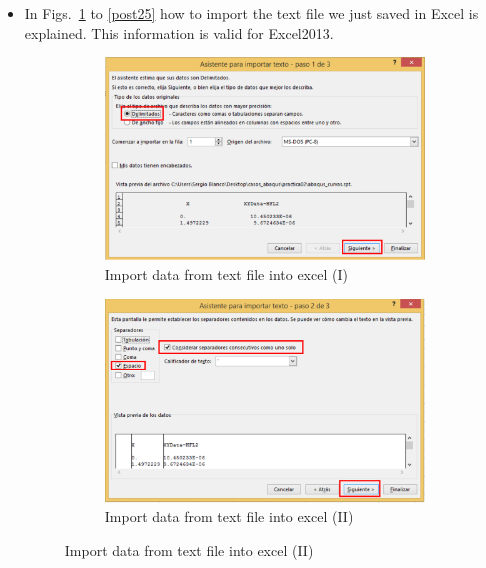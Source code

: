 \begin{itemize}
\item In Figs.~\ref{post22} to \ref{post25} how to import the text
  file we just saved in Excel is explained. This information is valid
  for Excel2013.
  \begin{figure}[!h]
    \centering
    \begin{subfigure}[!h]{0.50\textwidth}
      \includegraphics[width=\textwidth]{./body/images/post22.pdf}
      \caption{Import data from text file into excel (I)}
      \label{post22}
    \end{subfigure}%
    \begin{subfigure}[!h]{0.50\textwidth}
      \includegraphics[width=\textwidth]{./body/images/post23.pdf}
      \caption{Import data from text file into excel (II)}
      \label{post23}
    \end{subfigure}%


\end{figure}
\end{itemize}
